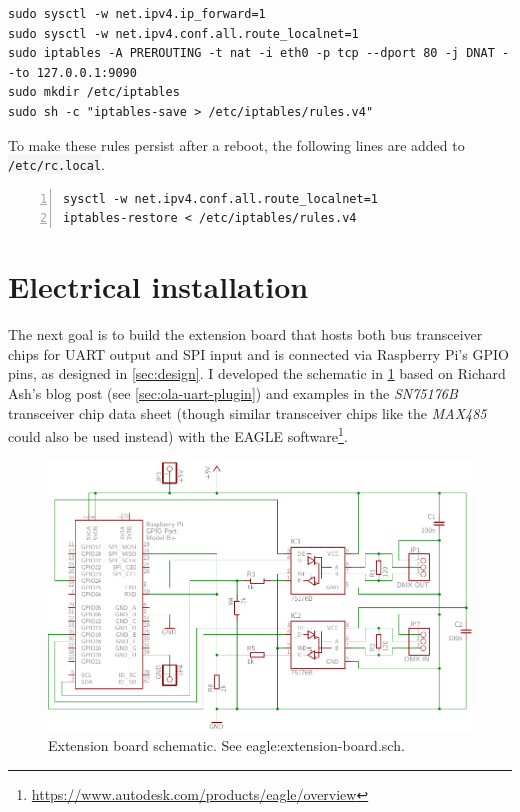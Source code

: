\begin{lstlisting}[style=myBash]
sudo sysctl -w net.ipv4.ip_forward=1
sudo sysctl -w net.ipv4.conf.all.route_localnet=1
sudo iptables -A PREROUTING -t nat -i eth0 -p tcp --dport 80 -j DNAT --to 127.0.0.1:9090
sudo mkdir /etc/iptables
sudo sh -c "iptables-save > /etc/iptables/rules.v4"
\end{lstlisting}

To make these rules persist after a reboot, the following lines are
added to \colorbox{WhiteSmoke}{\lstinline!/etc/rc.local!}.

\begin{lstlisting}[numbers=left, style=myBash]
sysctl -w net.ipv4.conf.all.route_localnet=1
iptables-restore < /etc/iptables/rules.v4
\end{lstlisting}

\section{Electrical installation}\label{sec:electrical}

The next goal is to build
the extension board that hosts both bus transceiver chips for UART
output and SPI input and is connected via Raspberry Pi's GPIO pins, as
designed in \cref{sec:design}. I developed the schematic in
\cref{fig:extension-board-schematic} based on Richard Ash's blog post
(see \cref{sec:ola-uart-plugin}) and examples in the \emph{SN75176B}
transceiver chip data sheet \citep{sn75176b} (though similar transceiver
chips like the \emph{MAX485} could also be used instead) with the EAGLE
software\footnote{\url{https://www.autodesk.com/products/eagle/overview}}.

\begin{figure}
\centering
\includegraphics[width=1.00000\textwidth]{Bilder/extension-board-schematic.pdf}
\caption[Extension board schematic]{Extension board schematic. See
\gls{eagle:extension-board.sch}.}\label{fig:extension-board-schematic}
\end{figure}

